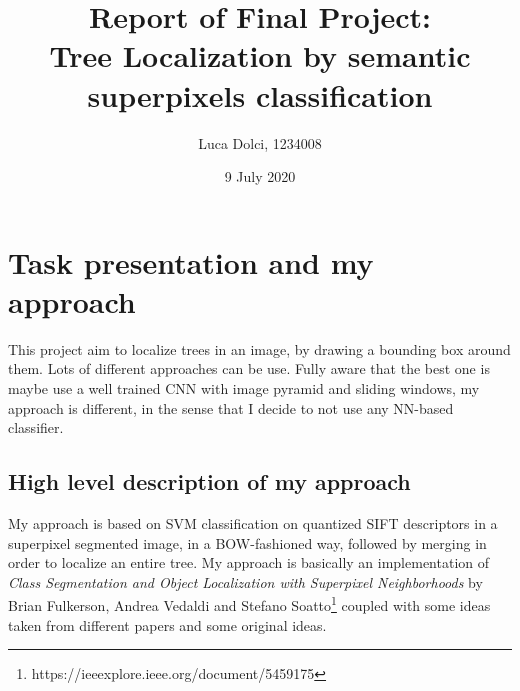 \documentclass[a4paper,titlepaget]{article}
\date{9 July 2020}
\begin{document}
\title{\textbf{Report of Final Project:\\ Tree Localization by semantic superpixels classification}}
\author{Luca Dolci, 1234008}
\maketitle
\newpage


\section{Task presentation and my approach}
This project aim to localize trees in an image, by drawing a bounding box
around them. Lots of different approaches can be use. Fully aware that the best
one is maybe use a well trained CNN with image pyramid and sliding windows, my
approach is different, in the sense that I decide to not use any NN-based
classifier.

\subsection{High level description of my approach}
My approach is based on SVM classification on quantized SIFT
descriptors in a superpixel segmented image, in a BOW-fashioned way, followed by merging in order to localize an entire tree. My approach
is basically an implementation of \emph{Class Segmentation and Object Localization with Superpixel Neighborhoods} by Brian Fulkerson, Andrea Vedaldi and Stefano Soatto\footnote{https://ieeexplore.ieee.org/document/5459175} coupled with some ideas taken from different papers and some original ideas.
\end{document}
